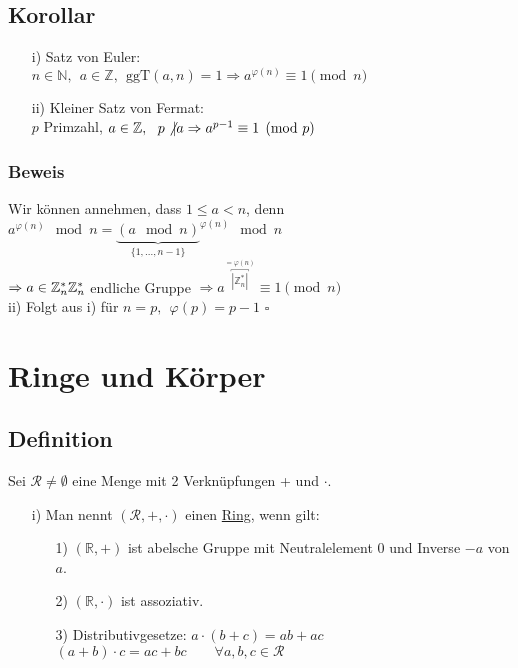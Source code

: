 \documentclass[12pt,titlepage, pdf]{article}
\newcommand{\R}{\mathds{R}}
\newcommand{\uline}[1]{\underline{#1}}
\renewcommand{\>}{\rightarrow}
\renewcommand{\*}{\cdot}
\renewcommand{\phi}{\varphi}
\begin{document}
\subsection{Korollar}
\begin{itemize}
	\item[i)] Satz von Euler:\\ $n \in \mathbb{N},~~ a \in \mathbb{Z},~~ \text{ggT}(a,n) = 1 \Rightarrow a^{\phi(n)} \equiv 1 \pmod{n}$
	\item[ii)] Kleiner Satz von Fermat:\\ $p$ Primzahl, $a \in \mathbb{Z},~~ p \not\vert a \Rightarrow a^{p-1} \equiv 1 \pmod{p}$
\end{itemize}
\subsubsection*{Beweis}
Wir können annehmen, dass $1 \leq a < n$, denn \\$a^{\phi(n)} \mod n = {\underbrace{(a \mod n)}_{\{1,...,n-1\}}}^{\phi(n)}\mod n$ \\
$\Rightarrow a \in \mathbb{Z}^*_n \\
\mathbb{Z}^*_n$ endliche Gruppe $\Rightarrow a^{\overbracket{|\mathbb{Z}^*_n|}^{ = \phi(n)}} \equiv 1 \pmod{n}$\\
ii) Folgt aus i) für $n = p,~~ \phi(p) = p-1$
\hfill$\square$
\newpage
\section{Ringe und Körper}
\subsection{Definition}
Sei $\mathcal{R} \neq \emptyset$ eine Menge mit 2 Verknüpfungen + und $\cdot$.
\begin{itemize}
	\item[i)] Man nennt $(\mathcal{R}, + , \cdot)$ einen \uline{Ring}, wenn gilt: 
	\begin{itemize}
		\item[1)] $(\R, + )$ ist abelsche Gruppe mit Neutralelement 0 und Inverse $-a$ von $a$.
		\item[2)] $(\R, \cdot)$ ist assoziativ. 
		\item[3)] Distributivgesetze: $a \cdot (b+c) = ab + ac$\\
		\noindent\hspace*{32.5mm}$ (a+b) \cdot c = ac + bc \qquad \forall a,b,c \in \mathcal{R}$
	\end{itemize}
\end{itemize}	
\end{document}
